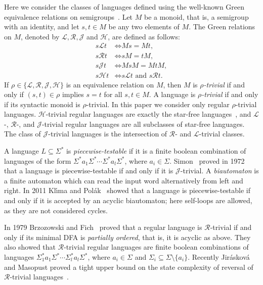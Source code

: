 \documentclass{llncs}
\newcommand{\Sig}{\Sigma}
\newcommand{\txt}[1]{\mbox{ #1 }}
\newcommand{\gL}{{\mathcal L}}
\newcommand{\gR}{{\mathcal R}}
\newcommand{\gJ}{{\mathcal J}}
\newcommand{\gH}{{\mathcal H}}
\newcommand{\Lra}{{\Leftrightarrow}}
\begin{document}
Here we consider the classes of languages defined using the well-known Green equivalence relations on semigroups~\cite{Pin97}. Let $M$ be a monoid, that is, a semigroup with an identity, and let $s, t \in M$ be any two elements of $M$. The Green relations on $M$, denoted by $\gL,\gR,\gJ$ and $\gH$, are defined as follows: 
\begin{align*}
 s \mathbin{\gL} t &\mathbin{\Lra} Ms = Mt, \\
 s \mathbin{\gR} t &\mathbin{\Lra} sM = tM, \\
 s \mathbin{\gJ} t &\mathbin{\Lra} MsM = MtM, \\
 s \mathbin{\gH} t &\mathbin{\Lra} s \mathbin{\gL} t \txt{and} s \mathbin{\gR} t.
\end{align*}
If $\rho \in \{\gL, \gR, \gJ, \gH\}$ is an equivalence relation on $M$, then $M$ is \emph{$\rho$-trivial} if and only if $(s, t) \in \rho$ implies $s = t$ for all $s, t \in M$. A language is \emph{$\rho$-trivial} if and only if its syntactic monoid is $\rho$-trivial. 
In this paper we consider only regular $\rho$-trivial languages. 
$\gH$-trivial regular languages are exactly the star-free languages~\cite{Pin97}, and $\gL$-, $\gR$-, and $\gJ$-trivial regular languages are all subclasses of star-free languages. 
The class of $\gJ$-trivial languages is the intersection of $\gR$- and $\gL$-trivial classes. 

A language $L \subseteq \Sig^*$ is \emph{piecewise-testable} if it is a finite boolean combination of languages of the form $\Sig^* a_1 \Sig^* \cdots \Sig^* a_l \Sig^*$, where $a_i \in \Sig$. Simon~\cite{Sim72,Sim75} proved in 1972 that a language is piecewise-testable if and only if it is $\gJ$-trivial. A \emph{biautomaton} is a finite automaton which can read the input word alternatively from left and  right. In 2011 Kl\'{\i}ma and Pol{\'a}k~\cite{KP11} showed that a language is piecewise-testable if and only if it is accepted by an acyclic biautomaton; here self-loops are allowed, as they are not considered cycles. 

In 1979 Brzozowski and Fich~\cite{BrFi80} proved that a regular language is $\gR$-trivial if and only if its minimal DFA is \emph{partially ordered}, that is, it is acyclic as above. They also showed that $\gR$-trivial regular languages are  finite boolean combinations of languages $\Sig_1^* a_1\Sig^* \cdots \Sig_l^* a_l \Sig^*$, where $a_i \in \Sig$ and $\Sig_i \subseteq \Sig \setminus \{a_i\}$. Recently Jir{\'a}skov{\'a} and Masopust proved a tight upper bound on the state complexity of reversal of $\gR$-trivial languages~\cite{JiMa12}. 
\end{document}
